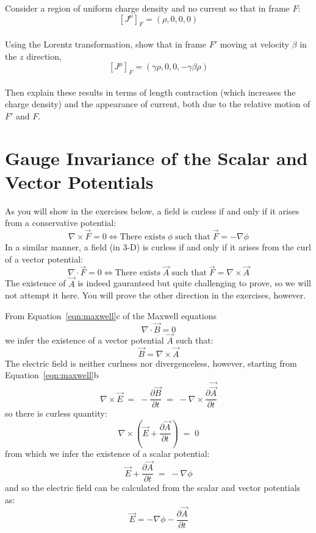 \documentclass[12pt]{article}
\begin{document}
\exercise Consider a region of uniform charge density and no current so that in frame $F$:
$$[J^\mu]_F = (\rho, 0, 0, 0)$$\\
Using the Lorentz transformation, show that in frame $F'$ moving at
velocity $\beta$ in the $z$ direction,
$$[J^\mu]_F = (\gamma \rho, 0, 0, -\gamma \beta \rho)$$\\
Then explain these results in terms of length contraction (which
increases the charge density) and the appearance of current, both due
to the relative motion of $F'$ and $F$.

\section{Gauge Invariance of the Scalar and Vector Potentials}

As you will show in the exercises below, a field is curless if and
only if it arises from a conservative potential:
$$\nabla \times \vec{F} = 0 \iff \text{There exists} \; \phi \; \text{such that} \; \vec{F} = -\nabla \phi$$
In a similar manner, a field (in 3-D) is curless if and only if it arises from the curl of a vector potential:
$$\nabla \cdot \vec{F} = 0 \iff \text{There exists} \; \vec{A} \; \text{such that} \; \vec{F} = \nabla \times \vec{A}$$
The existence of $\vec{A}$ is indeed gauranteed but quite challenging to
prove, so we will not attempt it here.  You will prove the other
direction in the exercises, however.

From Equation~\ref{eqn:maxwell}c of the Maxwell equations
$$\nabla \cdot \vec{B} = 0$$
we infer the existence of a vector potential $\vec{A}$ such that:
\begin{equation}
\label{eqn:bfield}
\vec{B} = \nabla \times \vec{A}
\end{equation}
The electric field is neither curlness nor divergenceless, however, starting from Equation~\ref{eqn:maxwell}b
$$\nabla \times \vec{E} \; = \; -\frac{\partial \vec{B}}{\partial t} \; = \; -\nabla \times \frac{\partial \vec{\vec{A}}}{\partial t} $$
so there is curless quantity:
$$\nabla \times \left( \vec{E} + \frac{\partial \vec{A}}{\partial t} \right) \; = \; 0$$
from which we infer the existence of a scalar potential:
$$\vec{E} + \frac{\partial \vec{A}}{\partial t} \; = \; -\nabla \phi$$
and so the electric field can be calculated from the scalar and vector potentials as:
\begin{equation}
\label{eqn:efield}
\vec{E} = -\nabla \phi - \frac{\partial \vec{A}}{\partial t}
\end{equation}
\end{document}
